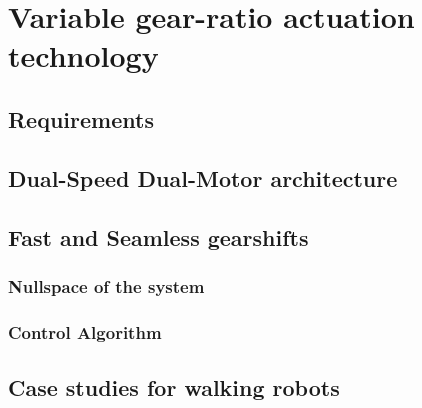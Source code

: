 \chapter{Variable gear-ratio actuation technology}
\label{sec:MultipleSpeedActuationTechnology}

\section{Requirements}
\label{sec:Requirements}


\section{Dual-Speed Dual-Motor architecture}
\label{sec:DSDM}


\section{Fast and Seamless gearshifts}
\label{sec:FastAndSeamlessGearshifts}

\subsection{Nullspace of the system}

\subsection{Control Algorithm}

\section{Case studies for walking robots}
\label{sec:walking}



